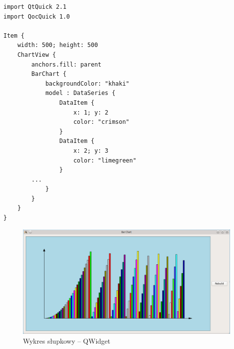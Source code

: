\begin{lstlisting}[caption=Przykładowy wykres w QML, label=code:bar:qml]
import QtQuick 2.1
import QocQuick 1.0

Item {
    width: 500; height: 500
    ChartView {
        anchors.fill: parent
        BarChart {
            backgroundColor: "khaki"
            model : DataSeries {
                DataItem {
                    x: 1; y: 2
                    color: "crimson"
                }
                DataItem {
                    x: 2; y: 3
                    color: "limegreen"
                }
		...
            }
        }
    }
}
\end{lstlisting}

\begin{figure}[H]
\centering
\includegraphics[scale=0.54]{img/BarChart_kubuntu.png}
\caption{Wykres słupkowy -- QWidget}\label{rys:bar:kubuntu}
\end{figure}





